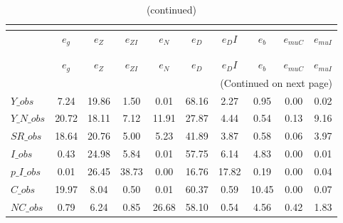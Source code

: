  
\begin{center}
\begin{longtable}{lccccccccc} 
\caption{VARIANCE DECOMPOSITION (in percent)}\\
 \label{Table:th_var_decomp_uncond}\\
\toprule 
$               $	 & 	 $        {e_g}$	 & 	 $        {e_Z}$	 & 	 $     {e_{ZI}}$	 & 	 $        {e_N}$	 & 	 $        {e_D}$	 & 	 $       {e_DI}$	 & 	 $        {e_b}$	 & 	 $    {e_{muC}}$	 & 	 $    {e_{muI}}$\\
\midrule \endfirsthead 
\caption{(continued)}\\
 \toprule \\ 
$               $	 & 	 $        {e_g}$	 & 	 $        {e_Z}$	 & 	 $     {e_{ZI}}$	 & 	 $        {e_N}$	 & 	 $        {e_D}$	 & 	 $       {e_DI}$	 & 	 $        {e_b}$	 & 	 $    {e_{muC}}$	 & 	 $    {e_{muI}}$\\
\midrule \endhead 
\midrule \multicolumn{10}{r}{(Continued on next page)} \\ \bottomrule \endfoot 
\bottomrule \endlastfoot 
$Y\_obs         $	 & 	         7.24	 & 	        19.86	 & 	         1.50	 & 	         0.01	 & 	        68.16	 & 	         2.27	 & 	         0.95	 & 	         0.00	 & 	         0.02 \\ 
$Y\_N\_obs      $	 & 	        20.72	 & 	        18.11	 & 	         7.12	 & 	        11.91	 & 	        27.87	 & 	         4.44	 & 	         0.54	 & 	         0.13	 & 	         9.16 \\ 
$SR\_obs        $	 & 	        18.64	 & 	        20.76	 & 	         5.00	 & 	         5.23	 & 	        41.89	 & 	         3.87	 & 	         0.58	 & 	         0.06	 & 	         3.97 \\ 
$I\_obs         $	 & 	         0.43	 & 	        24.98	 & 	         5.84	 & 	         0.01	 & 	        57.75	 & 	         6.14	 & 	         4.83	 & 	         0.00	 & 	         0.01 \\ 
$p\_I\_obs      $	 & 	         0.01	 & 	        26.45	 & 	        38.73	 & 	         0.00	 & 	        16.76	 & 	        17.82	 & 	         0.19	 & 	         0.00	 & 	         0.04 \\ 
$C\_obs         $	 & 	        19.97	 & 	         8.04	 & 	         0.50	 & 	         0.01	 & 	        60.37	 & 	         0.59	 & 	        10.45	 & 	         0.00	 & 	         0.07 \\ 
$NC\_obs        $	 & 	         0.79	 & 	         6.24	 & 	         0.85	 & 	        26.68	 & 	        58.10	 & 	         0.54	 & 	         4.56	 & 	         0.42	 & 	         1.83 \\ 

\end{longtable}
\end{center}
